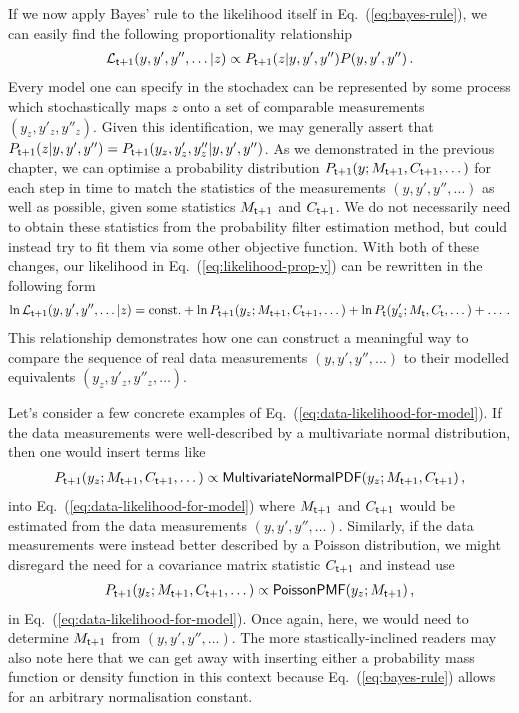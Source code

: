 If we now apply Bayes' rule to the likelihood itself in Eq.~(\ref{eq:bayes-rule}), we can easily find the following proportionality relationship
\begin{align}
{\cal L}_{{\sf t}+1}(y, y',y'', \dots\vert z) \propto P_{{\sf t}+1}(z\vert y, y',y'')P(y, y',y'') \label{eq:likelihood-prop-y}\,.
\end{align}
Every model one can specify in the stochadex can be represented by some process which stochastically maps $z$ onto a set of comparable measurements $(y_z, y'_z,y''_z)$. Given this identification, we may generally assert that $P_{{\sf t}+1}(z\vert y, y',y'')=P_{{\sf t}+1}(y_z, y'_z,y''_z\vert y, y',y'')$. As we demonstrated in the previous chapter, we can optimise a probability distribution $P_{{\sf t}+1}(y;M_{{\sf t}+1},C_{{\sf t}+1},\dots )$ for each step in time to match the statistics of the measurements $(y, y', y'', \dots)$ as well as possible, given some statistics $M_{{\sf t}+1}$ and $C_{{\sf t}+1}$. We do not necessarily need to obtain these statistics from the probability filter estimation method, but could instead try to fit them via some other objective function. With both of these changes, our likelihood in Eq.~(\ref{eq:likelihood-prop-y}) can be rewritten in the following form
\begin{align}
\ln {\cal L}_{{\sf t}+1}(y, y',y'', \dots\vert z) = {\rm const.} + \ln P_{{\sf t}+1}(y_z;M_{{\sf t}+1},C_{{\sf t}+1},\dots ) + \ln P_{{\sf t}}(y'_z;M_{{\sf t}},C_{{\sf t}},\dots ) + \dots \label{eq:data-likelihood-for-model} \,.
\end{align}
This relationship demonstrates how one can construct a meaningful way to compare the sequence of real data measurements $(y, y', y'', \dots)$ to their modelled equivalents $(y_z, y'_z, y''_z, \dots)$.

Let's consider a few concrete examples of Eq.~(\ref{eq:data-likelihood-for-model}). If the data measurements were well-described by a multivariate normal distribution, then one would insert terms like
\begin{align}
P_{{\sf t}+1}(y_z;M_{{\sf t}+1},C_{{\sf t}+1},\dots ) \propto {\sf MultivariateNormalPDF}(y_z;M_{{\sf t}+1},C_{{\sf t}+1})\,,
\end{align}
into Eq.~(\ref{eq:data-likelihood-for-model}) where $M_{{\sf t}+1}$ and $C_{{\sf t}+1}$ would be estimated from the data measurements $(y, y', y'', \dots)$. Similarly, if the data measurements were instead better described by a Poisson distribution, we might disregard the need for a covariance matrix statistic $C_{{\sf t}+1}$ and instead use
\begin{align}
P_{{\sf t}+1}(y_z;M_{{\sf t}+1},C_{{\sf t}+1},\dots ) \propto {\sf PoissonPMF}(y_z;M_{{\sf t}+1})\,,
\end{align}
in Eq.~(\ref{eq:data-likelihood-for-model}). Once again, here, we would need to determine $M_{{\sf t}+1}$ from $(y, y', y'', \dots)$. The more stastically-inclined readers may also note here that we can get away with inserting either a probability mass function or density function in this context because Eq.~(\ref{eq:bayes-rule}) allows for an arbitrary normalisation constant.


